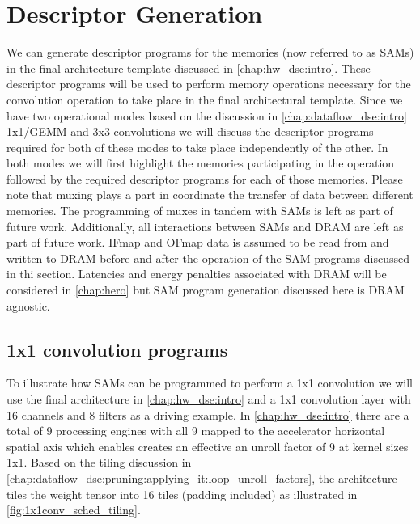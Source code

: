 

\section{Descriptor Generation}
\label{chap:sams:acc_scheduling}

We can generate descriptor programs for the memories (now referred to as SAMs)
in the final architecture template discussed in \autoref{chap:hw_dse:intro}.
These descriptor programs will be used to perform memory operations necessary
for the convolution operation to take place in the final architectural template.
Since we have two operational modes based on the discussion in
\autoref{chap:dataflow_dse:intro} 1x1/GEMM and 3x3 convolutions we will discuss the
descriptor programs required for both of these modes to take place independently of
the other. In both modes we will first highlight the memories participating in
the operation followed by the required descriptor programs for each of those
memories. Please note that muxing plays a part in coordinate the transfer of
data between different memories. The programming of muxes in tandem with SAMs is
left as part of future work. Additionally, all interactions between SAMs and
DRAM are left as part of future work. IFmap and OFmap data is assumed to be read
from and written to DRAM before and after the operation of the SAM programs
discussed in thi section. Latencies and energy penalties associated with DRAM
will be considered in \autoref{chap:hero} but SAM program generation discussed
here is DRAM agnostic.

\subsection{1x1 convolution programs}
\label{chap:sams:acc_scheduling:1x1}

To illustrate how SAMs can be programmed to perform a 1x1 convolution we will
use the final architecture in \autoref{chap:hw_dse:intro} and a 1x1 convolution
layer with 16 channels and 8 filters as a driving example. In
\autoref{chap:hw_dse:intro} there are a total of 9 processing engines with all 9
mapped to the accelerator horizontal spatial axis which enables creates an
effective an unroll factor of 9 at kernel sizes 1x1. Based on the tiling
discussion in
\autoref{chap:dataflow_dse:pruning:applying_it:loop_unroll_factors}, the
architecture tiles the weight tensor into 16 tiles (padding included) as
illustrated in \autoref{fig:1x1conv_sched_tiling}.

